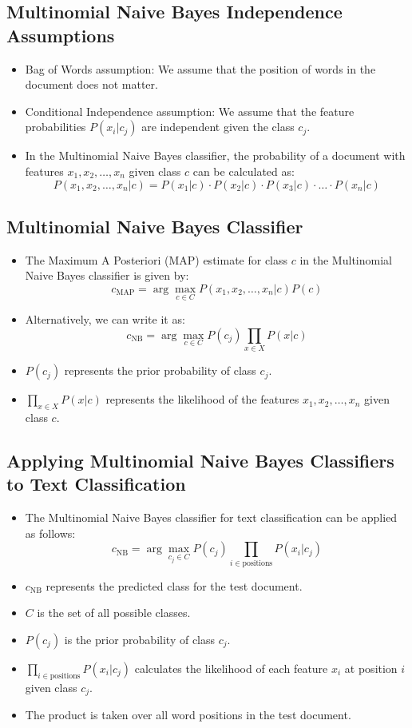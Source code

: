 \subsection{Multinomial Naive Bayes Independence Assumptions}

\begin{itemize}
    \item Bag of Words assumption: We assume that the position of words in the document does not matter.
    \item Conditional Independence assumption: We assume that the feature probabilities $P(x_i | c_j)$ are independent given the class $c_j$.
    \item In the Multinomial Naive Bayes classifier, the probability of a document with features $x_1, x_2, \ldots, x_n$ given class $c$ can be calculated as:
    \[
    P(x_1, x_2, \ldots, x_n | c) = P(x_1 | c) \cdot P(x_2 | c) \cdot P(x_3 | c) \cdot \ldots \cdot P(x_n | c)
    \]
\end{itemize}

\subsection{Multinomial Naive Bayes Classifier}
\begin{itemize}
    \item The Maximum A Posteriori (MAP) estimate for class $c$ in the Multinomial Naive Bayes classifier is given by:
    \[
    c_{\text{MAP}} = \arg\max_{c \in C} P(x_1, x_2, \ldots, x_n | c)P(c)
    \]
    \item Alternatively, we can write it as:
    \[
    c_{\text{NB}} = \arg\max_{c \in C} P(c_j) \prod_{x \in X} P(x | c)
    \]
    \item $P(c_j)$ represents the prior probability of class $c_j$.
    \item $\prod_{x \in X} P(x | c)$ represents the likelihood of the features $x_1, x_2, \ldots, x_n$ given class $c$.
\end{itemize}


\subsection{Applying Multinomial Naive Bayes Classifiers to Text Classification}
\begin{itemize}
    \item The Multinomial Naive Bayes classifier for text classification can be applied as follows:
    \[
    c_{\text{NB}} = \arg\max_{c_j \in C} P(c_j) \prod_{i \in \text{positions}} P(x_i | c_j)
    \]
    \item $c_{\text{NB}}$ represents the predicted class for the test document.
    \item $C$ is the set of all possible classes.
    \item $P(c_j)$ is the prior probability of class $c_j$.
    \item $\prod_{i \in \text{positions}} P(x_i | c_j)$ calculates the likelihood of each feature $x_i$ at position $i$ given class $c_j$.
    \item The product is taken over all word positions in the test document.
\end{itemize}


